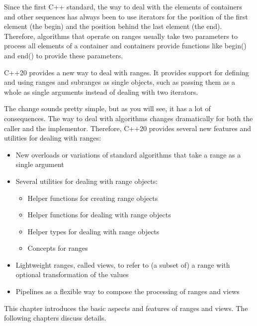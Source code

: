 Since the first C++ standard, the way to deal with the elements of containers and other sequences has always been to use iterators for the position of the first element (the begin) and the position behind the last element (the end). Therefore, algorithms that operate on ranges usually take two parameters to process all elements of a container and containers provide functions like begin() and end() to provide these parameters.

C++20 provides a new way to deal with ranges. It provides support for defining and using ranges and subranges as single objects, such as passing them as a whole as single arguments instead of dealing with two iterators.

The change sounds pretty simple, but as you will see, it has a lot of consequences. The way to deal with algorithms changes dramatically for both the caller and the implementor. Therefore, C++20 provides several new features and utilities for dealing with ranges:


\begin{itemize}
\item
New overloads or variations of standard algorithms that take a range as a single argument

\item
Several utilities for dealing with range objects:
\begin{itemize}
\item
Helper functions for creating range objects

\item
Helper functions for dealing with range objects

\item
Helper types for dealing with range objects

\item
Concepts for ranges
\end{itemize}

\item
Lightweight ranges, called views, to refer to (a subset of) a range with optional transformation of the values

\item
Pipelines as a flexible way to compose the processing of ranges and views
\end{itemize}

This chapter introduces the basic aspects and features of ranges and views. The following chapters discuss details.





